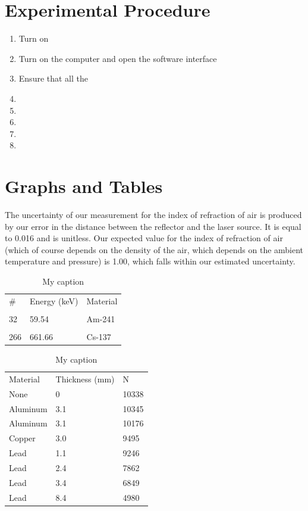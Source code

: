 \documentclass{amsart}
\begin{document}
\section{Experimental Procedure}
\begin{enumerate}
\item Turn on
\item Turn on the computer and open the software interface
\item Ensure that all the
\item
\item
\item
\item
\item
\end{enumerate}
\vfill
\section{Graphs and Tables}

The uncertainty of our measurement for the index of refraction of air is produced by our error in the distance between the reflector and the laser source. It is equal to 0.016 and is unitless. Our expected value for the index of refraction of air (which of course depends on the density of the air, which depends on the ambient temperature and pressure) is 1.00, which falls within our estimated uncertainty.

\begin{table}[]
\centering
\caption{My caption}
\label{my-label}
\begin{tabular}{lll}
\#  & Energy (keV) & Material \\
    &              &          \\
32  & 59.54        & Am-241   \\
    &              &          \\
266 & 661.66       & Cs-137
\end{tabular}
\end{table}

\begin{table}[]
\centering
\caption{My caption}
\label{my-label}
\begin{tabular}{lll}
Material & Thickness (mm) & N      \\
None     & 0              & 10338 \\
Aluminum & 3.1            & 10345 \\
Aluminum & 3.1            & 10176 \\
Copper   & 3.0            & 9495  \\
Lead     & 1.1            & 9246  \\
Lead     & 2.4            & 7862  \\
Lead     & 3.4            & 6849  \\
Lead     & 8.4            & 4980
\end{tabular}
\end{table}
\end{document}
